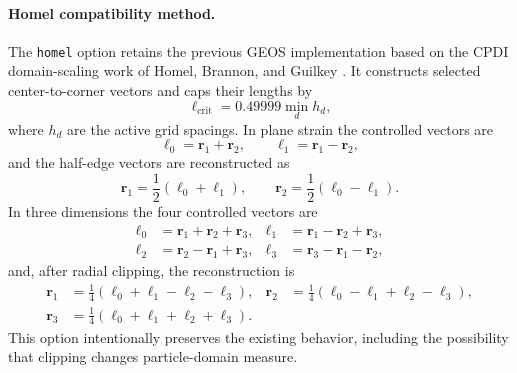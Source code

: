 \paragraph{Homel compatibility method.}
The \texttt{homel} option retains the previous GEOS implementation based on the CPDI domain-scaling work of Homel, Brannon, and Guilkey \cite{homel2016domaindef}.  It constructs selected center-to-corner vectors and caps their lengths by
\begin{equation}
  \ell_{\mathrm{crit}} = 0.49999\min_d h_d,
  \label{eq:cpdi-domain-scale-lcrit}
\end{equation}
where $h_d$ are the active grid spacings.  In plane strain the controlled vectors are
\begin{equation}
  \boldsymbol{\ell}_0=\boldsymbol{r}_1+\boldsymbol{r}_2,
  \qquad
  \boldsymbol{\ell}_1=\boldsymbol{r}_1-\boldsymbol{r}_2,
  \label{eq:cpdi-scaling-2d-lvectors}
\end{equation}
and the half-edge vectors are reconstructed as
\begin{equation}
  \boldsymbol{r}_1=\frac{1}{2}(\boldsymbol{\ell}_0+\boldsymbol{\ell}_1),
  \qquad
  \boldsymbol{r}_2=\frac{1}{2}(\boldsymbol{\ell}_0-\boldsymbol{\ell}_1).
  \label{eq:cpdi-scaling-2d-reconstruct}
\end{equation}
In three dimensions the four controlled vectors are
\begin{align}
  \boldsymbol{\ell}_0&=\boldsymbol{r}_1+\boldsymbol{r}_2+\boldsymbol{r}_3,
  &
  \boldsymbol{\ell}_1&=\boldsymbol{r}_1-\boldsymbol{r}_2+\boldsymbol{r}_3,
  \label{eq:cpdi-scaling-3d-lvectors-a}\\
  \boldsymbol{\ell}_2&=\boldsymbol{r}_2-\boldsymbol{r}_1+\boldsymbol{r}_3,
  &
  \boldsymbol{\ell}_3&=\boldsymbol{r}_3-\boldsymbol{r}_1-\boldsymbol{r}_2,
  \label{eq:cpdi-scaling-3d-lvectors-b}
\end{align}
and, after radial clipping, the reconstruction is
\begin{align}
  \boldsymbol{r}_1&=\frac{1}{4}(\boldsymbol{\ell}_0+\boldsymbol{\ell}_1-\boldsymbol{\ell}_2-\boldsymbol{\ell}_3),
  &
  \boldsymbol{r}_2&=\frac{1}{4}(\boldsymbol{\ell}_0-\boldsymbol{\ell}_1+\boldsymbol{\ell}_2-\boldsymbol{\ell}_3),
  \label{eq:cpdi-scaling-3d-reconstruct-a}\\
  \boldsymbol{r}_3&=\frac{1}{4}(\boldsymbol{\ell}_0+\boldsymbol{\ell}_1+\boldsymbol{\ell}_2+\boldsymbol{\ell}_3).
  \label{eq:cpdi-scaling-3d-reconstruct-b}
\end{align}
This option intentionally preserves the existing behavior, including the possibility that clipping changes particle-domain measure.

